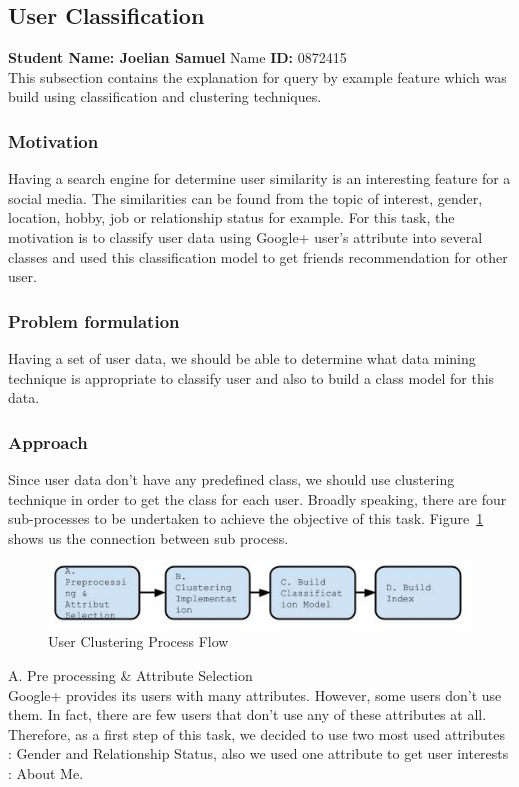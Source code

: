 \subsection{User Classification}
\textbf{Student Name: Joelian Samuel }Name \textbf{ID:} 0872415\\
This subsection contains the explanation for query by example feature which was build using classification and clustering techniques.
\subsubsection*{Motivation}
Having a search engine for determine user similarity is an interesting feature for a social media. The similarities can be found from the topic of interest, gender, location, hobby, job  or relationship status for example. For this task, the motivation is to classify user data using Google+ user's attribute into several classes and used this classification model to get friends recommendation for other user. 
\subsubsection*{Problem formulation}
Having a set of user data, we should be able to determine what data mining technique is appropriate to classify user and also to build a class model for this data.  
\subsubsection*{Approach}
Since user data don't have any predefined class, we should use clustering technique in order to get the class for each user. Broadly speaking, there are four sub-processes to be undertaken to achieve the objective of this task. Figure~\ref{fig:usercluster} shows us the connection between sub process.
\begin{figure}[H]
	\centering
	\includegraphics[scale=0.7]{images/usercluster.png}
	\caption{User Clustering Process Flow}
	\label{fig:usercluster}
\end{figure}

A. Pre processing \& Attribute Selection \\
Google+ provides its users with many attributes. However, some users don’t use them. In fact, there are  few users that don’t use any of these attributes at all. Therefore, as a first step of this task, we decided to use two most used attributes : Gender and Relationship Status, also we used one attribute to get user interests : About Me.  \\

